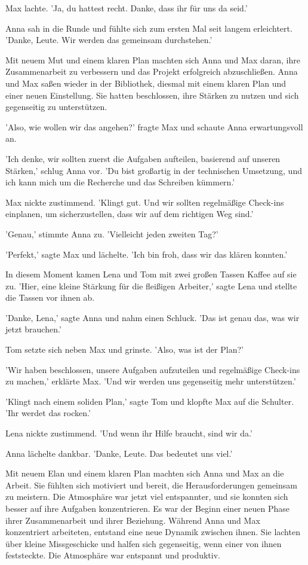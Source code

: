 \documentclass[12pt]{article}
\begin{document}
Max lachte. 'Ja, du hattest recht. Danke, dass ihr für uns da seid.'

Anna sah in die Runde und fühlte sich zum ersten Mal seit langem erleichtert. 'Danke, Leute. Wir werden das gemeinsam durchstehen.'

Mit neuem Mut und einem klaren Plan machten sich Anna und Max daran, ihre Zusammenarbeit zu verbessern und das Projekt erfolgreich abzuschließen. Anna und Max saßen wieder in der Bibliothek, diesmal mit einem klaren Plan und einer neuen Einstellung. Sie hatten beschlossen, ihre Stärken zu nutzen und sich gegenseitig zu unterstützen.

'Also, wie wollen wir das angehen?' fragte Max und schaute Anna erwartungsvoll an.

'Ich denke, wir sollten zuerst die Aufgaben aufteilen, basierend auf unseren Stärken,' schlug Anna vor. 'Du bist großartig in der technischen Umsetzung, und ich kann mich um die Recherche und das Schreiben kümmern.'

Max nickte zustimmend. 'Klingt gut. Und wir sollten regelmäßige Check-ins einplanen, um sicherzustellen, dass wir auf dem richtigen Weg sind.'

'Genau,' stimmte Anna zu. 'Vielleicht jeden zweiten Tag?'

'Perfekt,' sagte Max und lächelte. 'Ich bin froh, dass wir das klären konnten.'

In diesem Moment kamen Lena und Tom mit zwei großen Tassen Kaffee auf sie zu. 'Hier, eine kleine Stärkung für die fleißigen Arbeiter,' sagte Lena und stellte die Tassen vor ihnen ab.

'Danke, Lena,' sagte Anna und nahm einen Schluck. 'Das ist genau das, was wir jetzt brauchen.'

Tom setzte sich neben Max und grinste. 'Also, was ist der Plan?'

'Wir haben beschlossen, unsere Aufgaben aufzuteilen und regelmäßige Check-ins zu machen,' erklärte Max. 'Und wir werden uns gegenseitig mehr unterstützen.'

'Klingt nach einem soliden Plan,' sagte Tom und klopfte Max auf die Schulter. 'Ihr werdet das rocken.'

Lena nickte zustimmend. 'Und wenn ihr Hilfe braucht, sind wir da.'

Anna lächelte dankbar. 'Danke, Leute. Das bedeutet uns viel.'

Mit neuem Elan und einem klaren Plan machten sich Anna und Max an die Arbeit. Sie fühlten sich motiviert und bereit, die Herausforderungen gemeinsam zu meistern. Die Atmosphäre war jetzt viel entspannter, und sie konnten sich besser auf ihre Aufgaben konzentrieren. Es war der Beginn einer neuen Phase ihrer Zusammenarbeit und ihrer Beziehung. Während Anna und Max konzentriert arbeiteten, entstand eine neue Dynamik zwischen ihnen. Sie lachten über kleine Missgeschicke und halfen sich gegenseitig, wenn einer von ihnen feststeckte. Die Atmosphäre war entspannt und produktiv.
\end{document}
